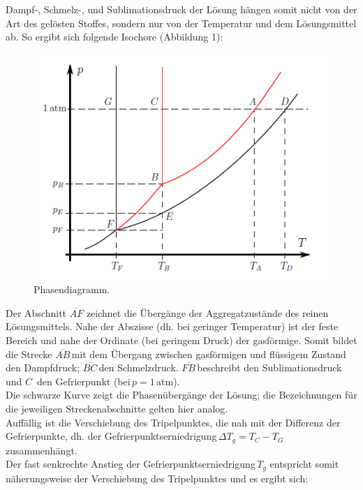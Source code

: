 \documentclass[12pt,a4paper,titlepage,headinclude,bibtotoc]{scrartcl}
\begin{document}
Dampf-, Schmelz-, und Sublimationsdruck der Lösung hängen somit nicht von der Art des gelösten Stoffes, sondern nur von der Temperatur und dem Lösungsmittel ab. So ergibt sich folgende Isochore (Abbildung 1):\\

\newpage

\begin{figure} [h!]
\begin{center}
\includegraphics[scale=1]{Phasendiagramm.png} \end{center}
\caption {Phasendiagramm. \protect\footnotemark}
\end{figure}

Der Abschnitt $\overline{AF}$ zeichnet die Übergänge der Aggregatzustände des reinen Lösungsmittels. Nahe der Abszisse (dh. bei geringer Temperatur) ist der feste Bereich und nahe der Ordinate (bei geringem Druck) der gasförmige.
Somit bildet die Strecke $\overline{AB}$\,mit dem Übergang zwischen gasförmigen und flüssigem Zustand den Dampfdruck; $\overline{BC}$\,den Schmelzdruck. $\overline{FB}$\,beschreibt den Sublimationsdruck und $C$\, den Gefrierpunkt (bei\,$p= 1\,\mathrm{atm}$).\\
Die schwarze Kurve zeigt die Phasenübergänge der Lösung; die Bezeichnungen für die jeweiligen Streckenabschnitte gelten hier analog.\\
Auffällig ist die Verschiebung des Tripelpunktes, die nah mit der Differenz der Gefrierpunkte, dh. der Gefrierpunktserniedrigung\,$\Delta T_g = T_C - T_G$ zusammenhängt. \\
Der fast senkrechte Anstieg der Gefrierpunktserniedrigung\,$T_g$ entspricht somit näherungsweise der Verschiebung des Tripelpunktes und es ergibt sich:  \\
\end{document}
